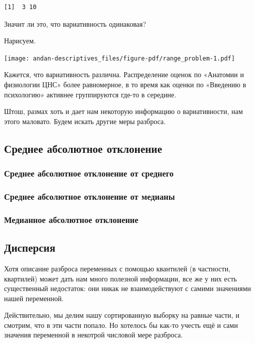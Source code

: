 \documentclass[
  letterpaper,
  DIV=11,
  numbers=noendperiod]{scrreprt}
\theoremstyle{definition}
\theoremstyle{remark}
\begin{document}
\begin{verbatim}
[1]  3 10
\end{verbatim}

Значит ли это, что вариативность одинаковая?

Нарисуем.

\texttt{[image: andan-descriptives\_files/figure-pdf/range\_problem-1.pdf]}

Кажется, что вариативность различна. Распределение оценок по «Анатомии и
физиологии ЦНС» более равномерное, в то время как оценки по «Введению в
психологию» активнее группируются где-то в середине.

Штош, размах хоть и дает нам некоторую информацию о вариативности, нам
этого маловато. Будем искать другие меры разброса.

\subsection{Среднее абсолютное
отклонение}\label{andan-descriptives-average-absolute-deviation}

\subsubsection{Среднее абсолютное отклонение от
среднего}\label{andan-descriptives-mean-absolute-deviation-around-the-mean}

\subsubsection{Среднее абсолютное отклонение от
медианы}\label{andan-descriptives-mean-absolute-deviation-around-the-median}

\subsubsection{Медианное абсолютное
отклонение}\label{andan-descriptives-median-absolute-deviation}

\subsection{Дисперсия}\label{andan-descriptives-variance}

Хотя описание разброса переменных с помощью квантилей (в частности,
квартилей) может дать нам много полезной информации, все же у них есть
существенный недостаток: они никак не взаимодействуют с самими
значениями нашей переменной.

Действительно, мы делим нашу сортированную выборку на равные части, и
смотрим, что в эти части попало. Но хотелось бы как-то учесть ещё и сами
значения переменной в некотрой числовой мере разброса.
\end{document}
